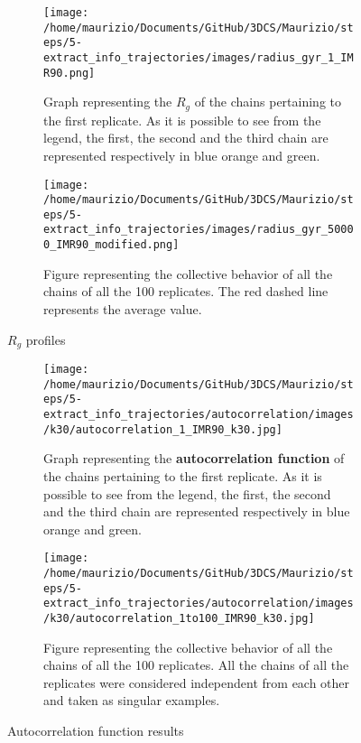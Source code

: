 \begin{figure}[H]
    \centering
    
    \begin{subfigure}{0.70\textwidth}
      \texttt{[image: /home/maurizio/Documents/GitHub/3DCS/Maurizio/steps/5-extract\_info\_trajectories/images/radius\_gyr\_1\_IMR90.png]}
      \caption{Graph representing the $R_g$ of the chains pertaining to the first replicate. As it is possible to see from the legend, the first, the second and the third chain are represented respectively in blue orange and green.}
      \label{fig:RG first replicate}
    \end{subfigure}
    \hfill
    \begin{subfigure}{0.70\textwidth}
      \texttt{[image: /home/maurizio/Documents/GitHub/3DCS/Maurizio/steps/5-extract\_info\_trajectories/images/radius\_gyr\_50000\_IMR90\_modified.png]}
      \caption{Figure representing the collective behavior of all the chains of all the 100 replicates. The red dashed line represents the average value.}
      \label{fig:RG collective replicates}
    \end{subfigure}
  
    \caption{$R_g$ profiles}
    \label{fig:RG figures}
\end{figure}

\begin{figure}[H]
    \centering
    
    \begin{subfigure}{0.75\textwidth}
      \texttt{[image: /home/maurizio/Documents/GitHub/3DCS/Maurizio/steps/5-extract\_info\_trajectories/autocorrelation/images/k30/autocorrelation\_1\_IMR90\_k30.jpg]}
      \caption{Graph representing the \textbf{autocorrelation function }of the chains pertaining to the first replicate. As it is possible to see from the legend, the first, the second and the third chain are represented respectively in blue orange and green.}
      \label{fig:autocorrelation function first replicate}
    \end{subfigure}
    \hfill
    \begin{subfigure}{0.75\textwidth}
      \texttt{[image: /home/maurizio/Documents/GitHub/3DCS/Maurizio/steps/5-extract\_info\_trajectories/autocorrelation/images/k30/autocorrelation\_1to100\_IMR90\_k30.jpg]}
      \caption{Figure representing the collective behavior of all the chains of all the 100 replicates. All the chains of all the replicates were considered independent from each other and taken as singular examples.}
      \label{fig:autocorrelation function collective replicates}
    \end{subfigure}
    \caption{Autocorrelation function results}
  \end{figure}

